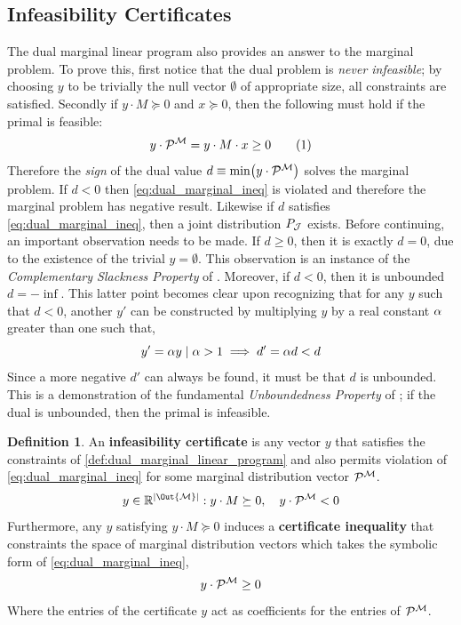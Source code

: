 \documentclass[aps, 10pt, english, twoside, pra, nofootinbib, longbibliography]{revtex4-1}
\theoremstyle{plain}
\theoremstyle{definition}
\newtheorem{definition}[theorem]{Definition}
\theoremstyle{remark}
\newcommand{\mscenario}{\mathcal{M}}
\newcommand{\jointvar}{\mathcal{J}}
\newcommand{\term}[1]{\textcolor{Mahogany}{\textbf{#1}}}
\begin{document}
    \subsection{Infeasibility Certificates}
    \label{sec:infeasibility_certificates}
    The dual marginal linear program also provides an answer to the marginal problem. To prove this, first notice that the dual problem is \textit{never infeasible}; by choosing $y$ to be trivially the null vector $\emptyset$ of appropriate size, all constraints are satisfied. Secondly if $y \cdot M \succeq 0$ and $x \succeq 0$, then the following must hold if the primal is feasible:
    \[ y \cdot \probvec^{\mscenario} =  y \cdot M \cdot x \geq 0 \eq \label{eq:dual_marginal_ineq} \]
    Therefore the \textit{sign} of the dual value $d \defined \min \br{y \cdot \probvec^{\mscenario}}$ solves the marginal problem. If $d < 0$ then \cref{eq:dual_marginal_ineq} is violated and therefore the marginal problem has negative result. Likewise if $d$ satisfies \cref{eq:dual_marginal_ineq}, then a joint distribution $\prob[\jointvar]$ exists. Before continuing, an important observation needs to be made. If $d \geq 0$, then it is exactly $d = 0$, due to the existence of the trivial $y = \emptyset$. This observation is an instance of the \textit{Complementary Slackness Property} of \cite{Bradley_1977}.  Moreover, if $d < 0$, then it is unbounded $d = -\inf$. This latter point becomes clear upon recognizing that for any $y$ such that $d < 0$, another $y'$ can be constructed by multiplying $y$ by a real constant $\alpha$ greater than one such that,
    \[ y' = \alpha y \mid \alpha > 1 \implies d' = \alpha d < d \]
    Since a more negative $d'$ can always be found, it must be that $d$ is unbounded. This is a demonstration of the fundamental \textit{Unboundedness Property} of \cite{Bradley_1977}; if the dual is unbounded, then the primal is infeasible.


    \begin{definition} An \term{infeasibility certificate} \cite{Andersen_2001} is any vector $y$ that satisfies the constraints of \cref{def:dual_marginal_linear_program} and also permits violation of \cref{eq:dual_marginal_ineq} for some marginal distribution vector $\probvec^{\mscenario}$.
    \[ y \in \R^{\abs{\Out{\mscenario}}} : y \cdot M \succeq 0, \quad y \cdot \probvec^{\mscenario} < 0 \]
    Furthermore, any $y$ satisfying $y \cdot M \succeq 0$ induces a \term{certificate inequality} that constraints the space of marginal distribution vectors which takes the symbolic form of \cref{eq:dual_marginal_ineq},
    \[ y \cdot \probvec^{\mscenario} \geq 0 \]
    Where the entries of the certificate $y$ act as coefficients for the entries of $\probvec^{\mscenario}$.
    \end{definition}
\end{document}
